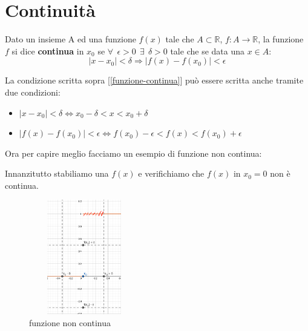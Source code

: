 \newpage
\section{Continuità}
\begin{definition}
    Dato un insieme A ed una funzione $f(x)$ tale che $A \subset \mathbb{R}$, $f: A \longrightarrow \mathbb{R}$, la funzione $f$ si dice \textbf{continua} in $x_0$ se $\forall \: \: \epsilon > 0 \: \: \exists \: \: \delta > 0$ tale che se data una $x \in A$:
    \begin{equation}\label{funzione-continua}
        |x - x_0| < \delta \Longrightarrow |f(x) - f(x_0)| < \epsilon
    \end{equation}
\end{definition}
La condizione scritta sopra [\ref{funzione-continua}] può essere scritta anche tramite due condizioni:
\begin{itemize}
    \item $|x - x_0| < \delta \Longleftrightarrow x_0 - \delta < x < x_0 + \delta$
    \item $|f(x) - f(x_0)| < \epsilon \Longleftrightarrow f(x_0) - \epsilon < f(x) < f(x_0) + \epsilon$
\end{itemize}
\begin{example}
Ora per capire meglio facciamo un esempio di funzione non continua:
\end{example}
Innanzitutto stabiliamo una $f(x)$ e verifichiamo che $f(x)$ in $x_0 = 0$ non è continua.\\ 
\begin{figure}
\vspace{-20pt}
    \centering
    \includegraphics[width=4.8cm, height=5cm]{images/esempio-non-continuita.png}
    \caption{funzione non continua}
    \label{fig:funzione-non-continua}
\end{figure}

